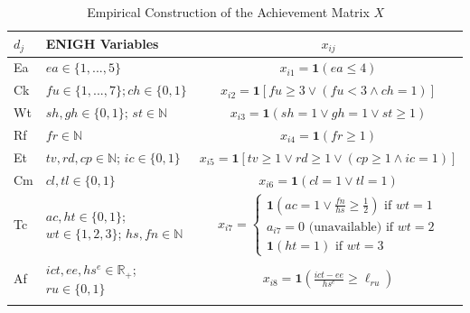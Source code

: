 \documentclass[11pt, a4paper]{article}
\begin{document}
{
\renewcommand{\arraystretch}{1.5}
\begin{table}[ht]
\centering
\caption{Empirical Construction of the Achievement Matrix $X$}
\small
\begin{tabularx}{\textwidth}{l X c}
\toprule
\toprule
$d_j$  & ENIGH Variables & $x_{ij}$ \\ \midrule
Ea  & $ea\in\{1,...,5\}$ & $x_{i1}=\mathbf{1}(ea\leq 4)$ \\
Ck  & $fu\in \{1,...,7\}; ch \in \{0,1\}$ & $x_{i2}=\mathbf{1}[fu \geq 3 \lor (fu < 3 \land ch = 1)]$  \\
Wt   & $sh, gh\in\{0,1\}$; $st \in \mathbb{N}$ & $ x_{i3}=\mathbf{1}(sh=1 \lor gh=1 \lor st\geq 1)$ \\
Rf  & $fr \in\mathbb{N}$ & $x_{i4}=\mathbf{1}(fr \geq 1)$ \\
Et  & $tv,rd,cp \in \mathbb{N}$; $ic\in\{0,1\}$ & $x_{i5}=\mathbf{1}[tv\geq 1 \lor rd \geq 1 \lor (cp \geq 1 \land ic = 1)] $\\
Cm  & $cl, tl\in \{0,1\}$ & $x_{i6}=\mathbf{1}(cl=1\lor tl =1)$ \\
Tc  & $ac,ht\in\{0,1\}$; $wt\in \{1,2,3\}$; $hs, fn\in \mathbb{N}$ & $x_{i7}=\begin{cases}
    \mathbf{1}(ac=1 \lor \frac{fn}{hs}\geq\frac{1}{2}) \text{ if } wt=1 \\
    a_{i7}=0 \text{ (unavailable) if } wt=2 \\
    \mathbf{1}(ht=1) \text{ if } wt=3
\end{cases}$ \\
Af  & $ict, ee, hs^e \in \mathbb{R_+}$; $ru\in\{0,1\}$ & $x_{i8}=\mathbf{1}\!\left(\frac{ict-ee}{hs^e}\geq \ell_{ru}\right)$ \\
\addlinespace
\bottomrule
\end{tabularx}
\begin{justify}
\scriptsize

\end{justify}
\end{table}}
\end{document}
